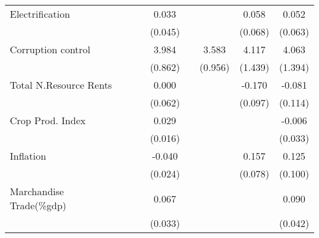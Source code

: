 \begin{table}[H]
\begin{adjustbox}{max width=\textwidth}
\begin{tabular}{l*{7}{c}}
\addlinespace
Electrification&                     &                     &       0.033         &                     &                     &       0.058         &       0.052         \\
            &                     &                     &     (0.045)         &                     &                     &     (0.068)         &     (0.063)         \\
\addlinespace
Corruption control&                     &                     &       3.984\sym{***}&                     &       3.583\sym{***}&       4.117\sym{***}&       4.063\sym{***}\\
            &                     &                     &     (0.862)         &                     &     (0.956)         &     (1.439)         &     (1.394)         \\
\addlinespace
Total N.Resource Rents&                     &                     &       0.000         &                     &                     &      -0.170\sym{*}  &      -0.081         \\
            &                     &                     &     (0.062)         &                     &                     &     (0.097)         &     (0.114)         \\
\addlinespace
Crop Prod. Index&                     &                     &       0.029\sym{*}  &                     &                     &                     &      -0.006         \\
            &                     &                     &     (0.016)         &                     &                     &                     &     (0.033)         \\
\addlinespace
Inflation   &                     &                     &      -0.040\sym{*}  &                     &                     &       0.157\sym{**} &       0.125         \\
            &                     &                     &     (0.024)         &                     &                     &     (0.078)         &     (0.100)         \\
\addlinespace
Marchandise Trade(\%gdp)&                     &                     &       0.067\sym{**} &                     &                     &                     &       0.090\sym{**} \\
            &                     &                     &     (0.033)         &                     &                     &                     &     (0.042)         \\

\end{tabular}
\end{adjustbox}
\end{table}
